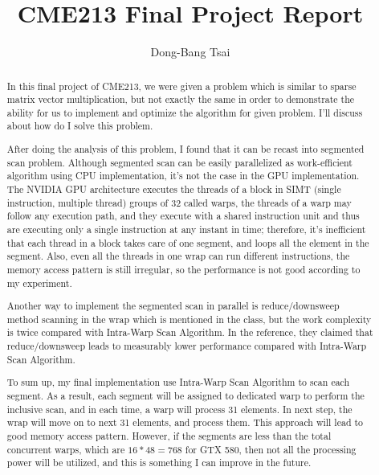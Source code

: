 \documentclass[preprint, prX, amsmath,amssymb]{revtex4-1}
\begin{document}
\title{CME213	Final Project Report}
	
\author{Dong-Bang Tsai}

\begin{abstract}
In this final project of CME213, we were given a problem which is similar to sparse matrix vector multiplication, but not exactly the same in order to demonstrate the ability for us to implement and optimize the algorithm for given problem. I'll discuss about how do I  solve this problem.

After doing the analysis of this problem, I found that it can be recast into segmented scan problem. Although segmented scan can be easily parallelized as work-efficient algorithm using CPU implementation, it's not the case in the GPU implementation. The NVIDIA GPU architecture executes the threads of a block in SIMT (single instruction, multiple thread) groups of 32 called warps, the threads of a warp may follow any execution path, and they execute with a shared instruction unit and thus are executing only a single instruction at any instant in time; therefore, it's inefficient that each thread in a block takes care of one segment, and loops all the element in the segment. Also, even all the threads in one wrap can run different instructions, the memory access pattern is still irregular, so the performance is not good according to my experiment. 

Another way to implement the segmented scan in parallel is reduce/downsweep method scanning in the wrap which is mentioned in the class, but the work complexity is twice compared with Intra-Warp Scan Algorithm\cite{Shubhabrata2008}. In the reference\cite{Shubhabrata2008}, they claimed that reduce/downsweep leads to measurably lower performance compared with Intra-Warp Scan Algorithm.

To sum up, my final implementation use Intra-Warp Scan Algorithm to scan each segment. As a result, each segment will be assigned to dedicated warp to perform the inclusive scan, and in each time, a warp will process 31 elements. In next step, the wrap will move on to next 31 elements, and process them. This approach will lead to good memory access pattern. However, if the segments are less than the total concurrent warps, which are $16 * 48 = 768$ for GTX 580,  then not all the processing power will be utilized, and this is something I can improve in the future. 

\end{abstract}
\end{document}
